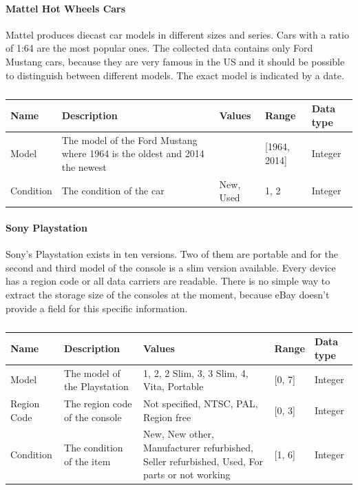 \paragraph{Mattel Hot Wheels Cars}
Mattel produces diecast car models in different sizes and series. Cars with a ratio of 1:64 are the most popular ones. The collected data contains only Ford Mustang cars, because they are very famous in the US and it should be possible to distinguish between different models. The exact model is indicated by a date.
\begin{table}[h!]
	\begin{center}
	\begin{tabular}{| l | p{5cm} | p{4cm} | l | l |}
		\hline
		Name & Description & Values & Range & Data type \\
		\hline
		Model & The model of the Ford Mustang where 1964 is the oldest and 2014 the newest & & [1964, 2014] & Integer \\
		\hline
		Condition & The condition of the car & New, Used & {1, 2} & Integer \\
		\hline
	\end{tabular}
	\end{center}
	\caption{}
\end{table}

\paragraph{Sony Playstation}
Sony's Playstation exists in ten versions. Two of them are portable and for the second and third model of the console is a slim version available. Every device has a region code or all data carriers are readable. There is no simple way to extract the storage size of the consoles at the moment, because eBay doesn't provide a field for this specific information.
\begin{table}[h!]
	\begin{center}
	\begin{tabular}{| l | p{5cm} | p{4cm} | l | l |}
		\hline
		Name & Description & Values & Range & Data type \\
		\hline
		Model & The model of the Playstation & 1, 2, 2 Slim, 3, 3 Slim, 4, Vita, Portable & [0, 7] & Integer \\
		\hline
		Region Code & The region code of the console & Not specified, NTSC, PAL, Region free & [0, 3] & Integer \\
		\hline
		Condition & The condition of the item & New, New other, Manufacturer refurbished, Seller refurbished, Used, For parts or not working & [1, 6] & Integer \\
		\hline
	\end{tabular}
	\end{center}
	\caption{}
\end{table}

